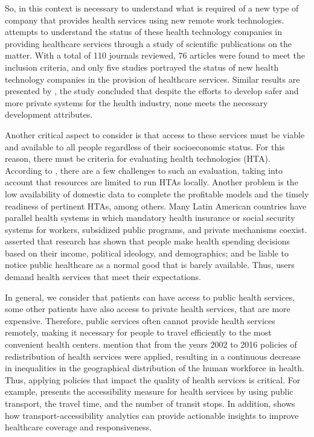 \documentclass[sustainability,article,submit,pdftex,moreauthors]{Definitions/mdpi}
\begin{document}
So, in this context is necessary to understand what is required of a new type of company that provides health services using new remote work technologies. \citet{chakraborty2021health} attempts to understand the status of these health technology companies in providing healthcare services through a study of scientific publications on the matter. With a total of 110 journals reviewed, 76 articles were found to meet the inclusion criteria, and only five studies portrayed the status of new health technology companies in the provision of healthcare services. Similar results are presented by \citet{qahtan2022review}, the study concluded that despite the efforts to develop safer and more private systems for the health industry, none meets the necessary development attributes.

Another critical aspect to consider is that access to these services must be viable and available to all people regardless of their socioeconomic status. For this reason, there must be criteria for evaluating health technologies (HTA). According to \citet{drummond2022challenges}, there are a few challenges to such an evaluation, taking into account that resources are limited to run HTAs locally. Another problem is the low availability of domestic data to complete the profitable models and the timely readiness of pertinent HTAs, among others. Many Latin American countries have parallel health systems in which mandatory health insurance or social security systems for workers, subsidized public programs, and private mechanisms coexist. \citet{meleddu2020public} asserted that research has shown that people make health spending decisions based on their income, political ideology, and demographics; and be liable to notice public healthcare as a normal good that is barely available. Thus, users demand health services that meet their expectations. 

In general, we consider that patients can have access to public health services, some other patients have also access to private health services, that are more expensive. Therefore, public services often cannot provide health services remotely, making it necessary for people to travel efficiently to the most convenient health centers. \citet{mollahaliloglu2021change} mention that from the years 2002 to 2016 policies of redistribution of health services were applied, resulting in a continuous decrease in inequalities in the geographical distribution of the human workforce in health. Thus, applying policies that impact the quality of health services is critical. For example, \citet{sharma2021public} presents the accessibility measure for health services by using public transport, the travel time, and the number of transit stops. In addition, \citet{PEREIRA2021113773} shows how transport-accessibility analytics can provide actionable insights to improve healthcare coverage and responsiveness. 
\end{document}
